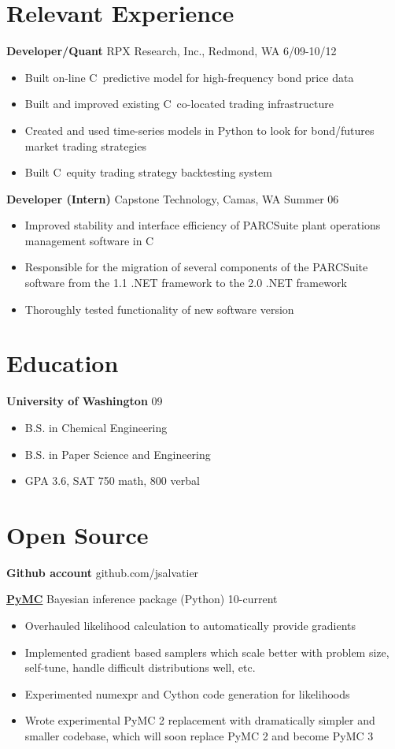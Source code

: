 \documentclass[margin]{res}
\newcommand{\bactivity}[3]{
  {\bf #1} #2 \hfill #3
    \vspace{6pt}
    \begin{itemize} \itemsep -2pt
      }
\newcommand{\eactivity}[0]{\end{itemize}}
\newcommand{\CS}
{C\nolinebreak[4]\hspace{-.05em}\raisebox{.22ex}{\footnotesize\bf \#}}
\begin{document}
 
 
\begin{resume} 
 

\section{Relevant Experience}
  \bactivity{Developer/Quant}{RPX Research, Inc., Redmond, WA}{6/09-10/12}
     \item Built on-line \CS\ predictive model for high-frequency bond price data
     \item Built and improved existing \CS\ co-located trading infrastructure  
     \item Created and used time-series models in Python to look for bond/futures market trading strategies 
     \item Built \CS\ equity trading strategy backtesting system 
  \eactivity

    \bactivity{Developer (Intern)}{Capstone Technology, Camas, WA}{Summer 06}
    \item Improved stability and interface efficiency of PARCSuite plant operations management software in \CS\
    \item Responsible for the migration of several components of the PARCSuite software from the 1.1 .NET framework to the 2.0 .NET framework 
    \item Thoroughly tested functionality of new software version 
  \eactivity

 \section{Education} 
  \bactivity{University of Washington}{}{09}
      \item B.S. in Chemical Engineering
      \item B.S. in Paper Science and Engineering
      \item GPA 3.6, SAT 750 math, 800 verbal
  \eactivity
  
 \section{Open Source}
    {\bf Github account} github.com/jsalvatier 

    \bactivity{\href{https://github.com/pymc-devs/pymc\#readme}{PyMC} }{Bayesian inference package (Python)}{10-current}
      \item Overhauled likelihood calculation to automatically provide gradients 
      \item Implemented gradient based samplers which scale better with problem size, self-tune, handle difficult distributions well, etc.
      \item Experimented numexpr and Cython code generation for likelihoods
      \item Wrote experimental PyMC 2 replacement with dramatically simpler and smaller codebase, which will soon replace PyMC 2 and become PyMC 3
    \eactivity


\end{resume}
\end{document}
